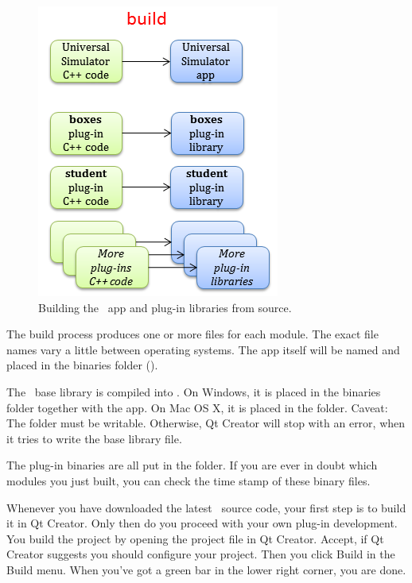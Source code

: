\begin{figure}
\centering
\includegraphics[scale=0.8]{graphics/workflow-build}
\caption{Building the \US\ app and plug-in libraries from source.}
\label{fig:workflow-build}
\end{figure}

The build process produces one or more files for each module. The exact file names vary a little between operating systems. The app itself will be named  and placed in the binaries folder (). 

The \US\ base library is compiled into . On Windows, it is placed in the binaries folder together with the app. On Mac OS X, it is placed in the  folder. Caveat: The  folder must be writable. Otherwise, Qt Creator will stop with an error, when it tries to write the base library file.

The plug-in binaries are all put in the  folder. If you are ever in doubt which modules you just built, you can check the time stamp of these binary files.

Whenever you have downloaded the latest \US\ source code, your first step is to build it in Qt Creator. Only then do you proceed with your own plug-in development. You build the project by opening the  project file in Qt Creator. Accept, if Qt Creator suggests you should configure your project. Then you click Build in the Build menu. When you've got a green bar in the lower right corner, you are done.

